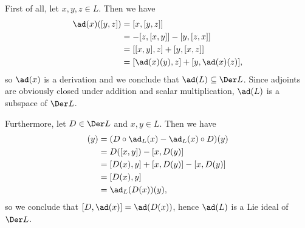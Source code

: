 First of all, let $x, y, z \in L$. Then we have
\begin{align*}
	\ad(x)([y, z]) &= [x, [y, z]]\\
	&= -[z, [x, y]] - [y, [z, x]]\\
	&= [[x, y], z] + [y, [x, z]]\\
	&= [\ad(x)(y), z] + [y, \ad(x)(z)],
\end{align*}
so $\ad(x)$ is a derivation and we conclude that $\ad(L) \subseteq \Der L$. Since
adjoints are obviously closed under addition and scalar multiplication,
$\ad(L)$ is a subspace of $\Der L$.

Furthermore, let $D \in \Der L$ and $x, y \in L$. Then we have
\begin{align*}
	[D, \ad_{L}(x)](y) &= (D \circ \ad_{L}(x) - \ad_{L}(x) \circ D)(y)\\
	&= D([x, y]) - [x, D(y)]\\
	&= [D(x), y] + [x, D(y)] - [x, D(y)]\\
	&= [D(x), y]\\
	&= \ad_{L}(D(x))(y),
\end{align*}
so we conclude that $[D, \ad(x)] = \ad(D(x))$, hence $\ad(L)$ is a Lie ideal
of $\Der L$.
